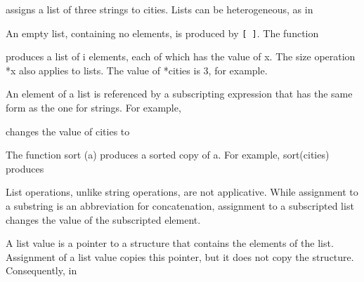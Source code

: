 \noindent
assigns a list of three strings to cities. Lists can be heterogeneous, as in



An empty list, containing no elements, is produced by {\tt [ ]}. The function



\noindent produces a list of i elements, each of which has the value
of x. The size operation *x also applies to lists. The value of
*cities is 3, for example.

An element of a list is referenced by a subscripting expression that
has the same form as the one for strings. For example,



\noindent changes the value of cities to



The function sort (a) produces a sorted copy of a. For example,
sort(cities) produces



List operations, unlike string operations, are not applicative. While
assignment to a substring is an abbreviation for concatenation,
assignment to a subscripted list changes the value of the subscripted
element.

A list value is a pointer to a structure that contains the elements of
the list. Assignment of a list value copies this pointer, but it does
not copy the structure. Consequently, in



